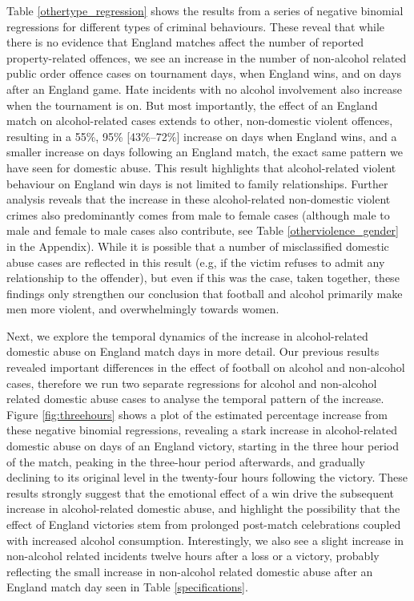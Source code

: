 \documentclass[12pt, letterpaper]{article}
\begin{document}
Table \ref{othertype_regression} shows the results from a series of negative binomial regressions for different types of criminal behaviours. These reveal that while there is no evidence that England matches affect the number of reported property-related offences, we see an increase in the number of non-alcohol related public order offence cases on tournament days, when England wins, and on days after an England game. Hate incidents with no alcohol involvement also increase when the tournament is on. But most importantly, the effect of an England match on alcohol-related cases extends to other, non-domestic violent offences, resulting in a 55\%, 95\% [43\%--72\%] increase on days when England wins, and a smaller increase on days following an England match, the exact same pattern we have seen for domestic abuse. This result highlights that alcohol-related violent behaviour on England win days is not limited to family relationships. Further analysis reveals that the increase in these alcohol-related non-domestic violent crimes also predominantly comes from male to female cases (although male to male and female to male cases also contribute, see Table \ref{otherviolence_gender} in the Appendix). While it is possible that a number of misclassified domestic abuse cases are reflected in this result (e.g, if the victim refuses to admit any relationship to the offender), but even if this was the case, taken together, these findings only strengthen our conclusion that football and alcohol primarily make men more violent, and overwhelmingly towards women.



Next, we explore the temporal dynamics of the increase in alcohol-related domestic abuse on England match days in more detail. Our previous results revealed important differences in the effect of football on alcohol and non-alcohol cases, therefore we run two separate regressions for alcohol and non-alcohol related domestic abuse cases to analyse the temporal pattern of the increase. Figure \ref{fig:threehours} shows a plot of the estimated percentage increase from these negative binomial regressions, revealing a stark increase in alcohol-related domestic abuse on days of an England victory, starting in the three hour period of the match, peaking in the three-hour period afterwards, and gradually declining to its original level in the twenty-four hours following the victory. These results strongly suggest that the emotional effect of a win drive the subsequent increase in alcohol-related domestic abuse, and highlight the possibility that the effect of England victories stem from prolonged post-match celebrations coupled with increased alcohol consumption.  Interestingly, we also see a slight increase in non-alcohol related incidents twelve hours after a loss or a victory, probably reflecting the small increase in non-alcohol related domestic abuse after an England match day seen in Table \ref{specifications}.
\end{document}
